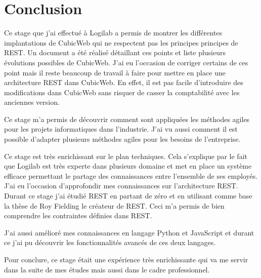 \chapter*{Conclusion}
Ce stage que j'ai effectué à Logilab a permis de montrer les différentes implantations de CubicWeb qui ne respectent pas les principes principes de REST. Un document a été réalisé détaillant ces points et liste plusieurs évolutions possibles de CubicWeb. J'ai eu l'occasion de corriger certains de ces point mais il reste beaucoup de travail à faire pour mettre en place une architecture REST dans CubicWeb. En effet, il est pas facile d'introduire des modifications dans CubicWeb sans risquer de casser la comptabilité avec les anciennes version.    

Ce stage m'a permis de découvrir comment sont appliquées les méthodes agiles pour les projets informatiques
dans l'industrie. J'ai vu aussi comment il est
possible d'adapter plusieurs méthodes agiles pour les besoins de l'entreprise.

Ce stage est très enrichissant sur le plan techniques. Cela s'explique par le
fait que Logilab est très experte dans plusieurs domaine et met en place un système
efficace permettant le partage des connaissances entre l'ensemble de ses employés. J'ai eu
l'occasion d'approfondir mes connaissances sur l'architecture REST. Durant ce
stage j'ai étudié REST en partant de zéro et en utilisant comme base la thèse de
Roy Fielding le créateur de REST. Ceci m'a permis de bien comprendre les contraintes
définies dans REST. 

J'ai aussi amélioré mes connaissances en langage Python et JavaScript et durant ce j'ai pu
découvrir les fonctionnalités avancés de ces deux langages. 

Pour conclure, ce stage était une expérience très enrichissante qui va me servir dans la suite de mes études mais aussi dans le cadre professionnel.
